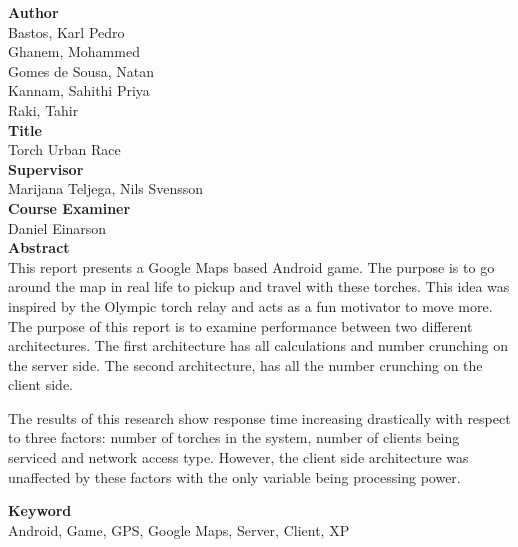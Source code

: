 \documentclass[12pt,a4paper,twoside]{report}
\begin{document}




\newpage
\noindent \textbf{Author} \\
 Bastos, Karl Pedro \\
 Ghanem, Mohammed \\
 Gomes de Sousa, Natan \\
 Kannam, Sahithi Priya \\
 Raki, Tahir  \\
 
\noindent \textbf{Title}\\
Torch Urban Race\\

\noindent \textbf{Supervisor}\\
Marijana Teljega, Nils Svensson\\

\noindent \textbf{Course Examiner}\\
Daniel Einarson\\

\noindent \textbf{Abstract }\\
This report presents a Google Maps based Android game. The purpose is to go around the map in real life to pickup and travel with these torches. This idea was inspired by the Olympic torch relay and acts as a fun motivator to move more. The purpose of this report is to examine performance between two different architectures. The first architecture has all calculations and number crunching on the server side. The second architecture, has all the number crunching on the client side. 

The results of this research show response time increasing drastically with respect to three factors: number of torches in the system, number of clients being serviced and network access type. However, the client side architecture was unaffected by these factors with the only variable being processing power.

\noindent \textbf{Keyword }\\
Android, Game, GPS, Google Maps, Server, Client, XP

\newpage
\tableofcontents
\newpage 
\end{document}
